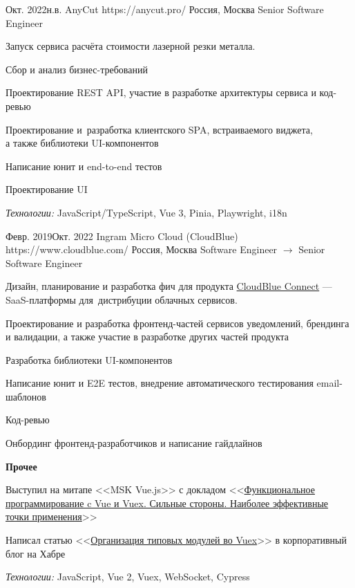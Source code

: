 \documentclass[10pt]{article}
\begin{document}
\job
	{Окт. 2022}{н.в.}
	{AnyCut}
	{https://anycut.pro/}
	{Россия, Москва}
	{Senior Software Engineer}
	{
	  Запуск сервиса расчёта стоимости лазерной резки металла.

	  \begin{supercompactitemize}
	  	\item Сбор и анализ бизнес-требований
		\item Проектирование REST API, участие в разработке архитектуры сервиса и код-ревью
		\item Проектирование и~разработка клиентского SPA, встраиваемого виджета, \\
		  а также библиотеки UI-компонентов
		\item Написание юнит и end-to-end тестов
		\item Проектирование UI
	  \end{supercompactitemize}

	  \textit{Технологии:} JavaScript/TypeScript, Vue 3, Pinia, Playwright, i18n
	}

\job
	{Февр. 2019}{Окт. 2022}
	{Ingram Micro Cloud (CloudBlue)}
	{https://www.cloudblue.com/}
	{Россия, Москва}
	{Software Engineer $\rightarrow$ Senior Software Engineer}
	{
	  Дизайн, планирование и разработка фич для продукта \href{https://connect.cloudblue.com/community/}{CloudBlue Connect} --- SaaS-платформы для~дистрибуции облачных сервисов.

	  \begin{supercompactitemize}
	  	\item Проектирование и разработка фронтенд-частей сервисов уведомлений, брендинга и валидации, а также участие в разработке других частей продукта
		\item Разработка библиотеки UI-компонентов
		\item Написание юнит и E2E тестов, внедрение автоматического тестирования email-шаблонов
		\item Код-ревью
		\item Онбординг фронтенд-разработчиков и написание гайдлайнов
	  \end{supercompactitemize}

	  \textbf{Прочее}

	  \begin{supercompactitemize}
	  	\item Выступил на митапе <<MSK Vue.js>> с докладом <<\href{https://www.youtube.com/watch?v=Rz_RynHNZKg}{Функциональное программирование c Vue и Vuex. Сильные стороны. Наиболее эффективные точки применения}>>
		\item Написал статью <<\href{https://habr.com/ru/company/odin_ingram_micro/blog/526094/}{Организация типовых модулей во Vuex}>> в корпоративный блог на Хабре
	  \end{supercompactitemize}

	  \textit{Технологии:} JavaScript, Vue 2, Vuex, WebSocket, Cypress
	}
\end{document}
